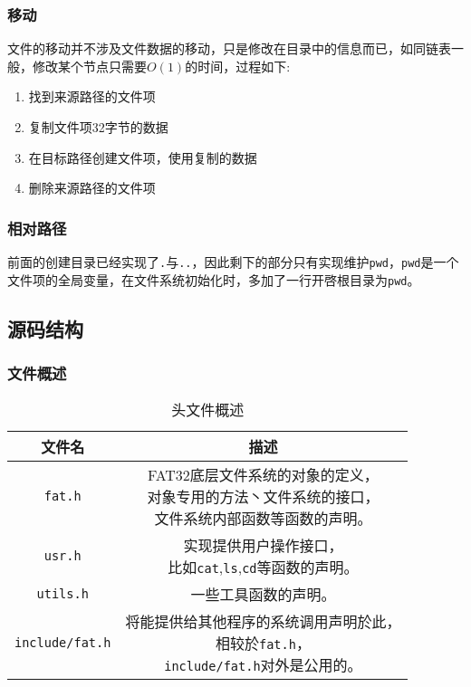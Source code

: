 \subsubsection{移动}

文件的移动并不涉及文件数据的移动，只是修改在目录中的信息而已，如同链表一般，修改某个节点只需要$O(1)$的时间，过程如下: 

\begin{enumerate}
  \item 找到来源路径的文件项
  \item 复制文件项32字节的数据
  \item 在目标路径创建文件项，使用复制的数据
  \item 删除来源路径的文件项
\end{enumerate}


\subsubsection{相对路径}

前面的创建目录已经实现了\texttt{.}与\texttt{..}，因此剩下的部分只有实现维护\texttt{pwd}，\texttt{pwd}是一个文件项的全局变量，在文件系统初始化时，多加了一行开啓根目录为\texttt{pwd}。


\subsection{源码结构}

\subsubsection{文件概述}

\begin{table}[H]
  \centering
  \caption{头文件概述}
  \begin{tabular}{|c|c|}
  \hline
  文件名 & 描述 \\
  \hline
  \texttt{fat.h}  & \makecell{FAT32底层文件系统的对象的定义，\\对象专用的方法丶文件系统的接口，\\文件系统内部函数等函数的声明。} \\
  \hline
  \texttt{usr.h} & \makecell{实现提供用户操作接口，\\比如\texttt{cat},\texttt{ls},\texttt{cd}等函数的声明。} \\
  \hline
  \texttt{utils.h} & 一些工具函数的声明。 \\
  \hline
  \texttt{include/fat.h} & \makecell{将能提供给其他程序的系统调用声明於此，\\相较於\texttt{fat.h}，\\\texttt{include/fat.h}对外是公用的。} \\
  \hline
  \end{tabular}
\end{table}


